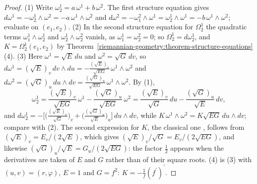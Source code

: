 \begin{proof}
(1) Write $\omega^1_2 = a\,\omega^1 + b\,\omega^2$. The first structure equation gives $d\omega^1 = -\omega^1_2 \wedge \omega^2 = -a\,\omega^1 \wedge \omega^2$ and
$d\omega^2 = -\omega^2_1 \wedge \omega^1 = \omega^1_2 \wedge \omega^1 = -b\,\omega^1 \wedge \omega^2$; evaluate on $(e_1, e_2)$.
(2) In the second structure equation for $\Omega^1_2$ the quadratic terms $\omega^1_1 \wedge \omega^1_2$ and $\omega^1_2 \wedge \omega^2_2$ vanish, as $\omega^1_1 = \omega^2_2 = 0$; so $\Omega^1_2 = d\omega^1_2$,
and $K = \Omega^1_2(e_1, e_2)$ by Theorem~\ref{riemannian-geometry:theorem-structure-equations}(4).
(3) Here $\omega^1 = \sqrt E\,du$ and $\omega^2 = \sqrt G\,dv$, so
$d\omega^1 = (\sqrt E)_v\,dv \wedge du = -\frac{(\sqrt E)_v}{\sqrt{EG}}\,\omega^1 \wedge \omega^2$ and $d\omega^2 = (\sqrt G)_u\,du \wedge dv = \frac{(\sqrt G)_u}{\sqrt{EG}}\,\omega^1 \wedge \omega^2$. By (1),
\[
\omega^1_2 = \frac{(\sqrt E)_v}{\sqrt{EG}}\,\omega^1 - \frac{(\sqrt G)_u}{\sqrt{EG}}\,\omega^2 = \frac{(\sqrt E)_v}{\sqrt G}\,du - \frac{(\sqrt G)_u}{\sqrt E}\,dv,
\]
and
$d\omega^1_2 = -\bigl[\bigl(\frac{(\sqrt E)_v}{\sqrt G}\bigr)_v + \bigl(\frac{(\sqrt G)_u}{\sqrt E}\bigr)_u\bigr]\,du \wedge dv$, while $K\,\omega^1 \wedge \omega^2 = K\sqrt{EG}\,du \wedge dv$; compare with (2). The second
expression for $K$, the classical one \cite[Chapter 4]{do-carmo-curves-surfaces}, follows from $(\sqrt E)_v = E_v/(2\sqrt E)$, which gives $(\sqrt E)_v/\sqrt G = E_v/(2\sqrt{EG})$, and likewise
$(\sqrt G)_u/\sqrt E = G_u/(2\sqrt{EG})$: the factor $\frac12$ appears when the derivatives are taken of $E$ and $G$ rather than of their square roots.
(4) is (3) with $(u, v) = (r, \varphi)$, $E = 1$ and $G = f^2$: $K = -\frac1f(f^{\prime})^{\prime}$.
\end{proof}

